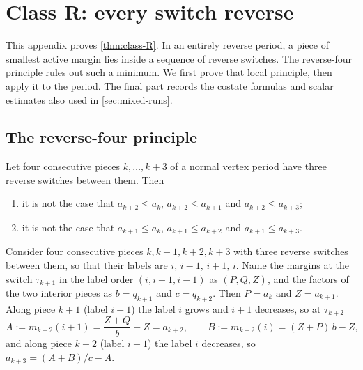 \section{Class R: every switch reverse}\label{sec:reverse}

This appendix proves \cref{thm:class-R}. In an entirely reverse period, a piece of smallest
active margin lies inside a sequence of reverse switches. The reverse-four principle rules out
such a minimum. We first prove that local principle, then apply it to the period. The final part
records the costate formulas and scalar estimates also used in \cref{sec:mixed-runs}.

\subsection{The reverse-four principle}\label{sec:rev-four}

\begin{lemma}\label{lem:reverse-four}
Let four consecutive pieces $k,\dots,k+3$ of a normal vertex period have three reverse switches
between them. Then
\begin{enumerate}[label=\textup{(\alph*)}]
\item it is not the case that $a_{k+2}\le a_k$, $a_{k+2}\le a_{k+1}$ and $a_{k+2}\le a_{k+3}$;
\item it is not the case that $a_{k+1}\le a_k$, $a_{k+1}\le a_{k+2}$ and $a_{k+1}\le a_{k+3}$.
\end{enumerate}
\end{lemma}

Consider four consecutive pieces $k,k+1,k+2,k+3$ with three reverse switches between them, so
that their labels are $i,\,i-1,\,i+1,\,i$. Name the margins at the switch $\tau_{k+1}$ in the label
order $(i,i+1,i-1)$ as $(P,Q,Z)$, and the factors of the two interior pieces as $b=q_{k+1}$ and
$c=q_{k+2}$. Then $P=a_k$ and $Z=a_{k+1}$. Along piece $k+1$ (label $i-1$) the label $i$ grows and
$i+1$ decreases, so at $\tau_{k+2}$
\[
  A:=m_{k+2}(i+1)=\frac{Z+Q}{b}-Z=a_{k+2},\qquad B:=m_{k+2}(i)=(Z+P)\,b-Z,
\]
and along piece $k+2$ (label $i+1$) the label $i$ decreases, so $a_{k+3}=(A+B)/c-A$.

